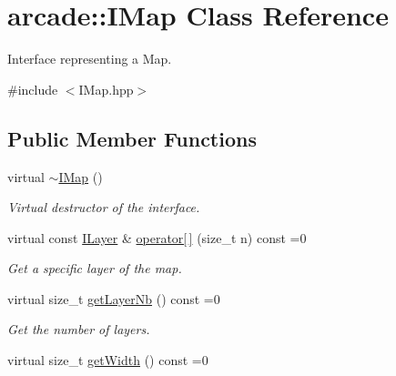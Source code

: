 \hypertarget{classarcade_1_1IMap}{}\section{arcade\+:\+:I\+Map Class Reference}
\label{classarcade_1_1IMap}


Interface representing a Map.  




{\ttfamily \#include $<$I\+Map.\+hpp$>$}

\subsection*{Public Member Functions}
\begin{DoxyCompactItemize}
\item 
\mbox{\label{classarcade_1_1IMap_aaa3aa1b624552b9ab830067ab42f78dd}} 
virtual \hyperlink{classarcade_1_1IMap_aaa3aa1b624552b9ab830067ab42f78dd}{$\sim$\+I\+Map} ()
\begin{DoxyCompactList}\small\item\em Virtual destructor of the interface. \end{DoxyCompactList}\item 
\mbox{\label{classarcade_1_1IMap_a97d81d77f7e3b950ed059d6dcc2dde0b}} 
virtual const \hyperlink{classarcade_1_1ILayer}{I\+Layer} \& \hyperlink{classarcade_1_1IMap_a97d81d77f7e3b950ed059d6dcc2dde0b}{operator\mbox{[}$\,$\mbox{]}} (size\+\_\+t n) const =0
\begin{DoxyCompactList}\small\item\em Get a specific layer of the map. \end{DoxyCompactList}\item 
\mbox{\label{classarcade_1_1IMap_a3e5fc4c5286f92fb49c8c7d0e79f4510}} 
virtual size\+\_\+t \hyperlink{classarcade_1_1IMap_a3e5fc4c5286f92fb49c8c7d0e79f4510}{get\+Layer\+Nb} () const =0
\begin{DoxyCompactList}\small\item\em Get the number of layers. \end{DoxyCompactList}\item 
\mbox{\label{classarcade_1_1IMap_a6e7534eeff05277f1429037f8b01e25f}} 
virtual size\+\_\+t \hyperlink{classarcade_1_1IMap_a6e7534eeff05277f1429037f8b01e25f}{get\+Width} () const =0

\end{DoxyCompactItemize}
